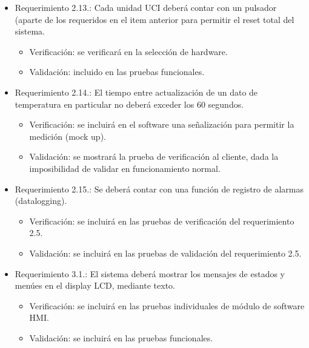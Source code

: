 \documentclass[
11pt, %
codirector, %
]{charter}
\begin{document}
\begin{itemize}
\begin{itemize}
\end{itemize}
\item Requerimiento 2.13.:  Cada unidad UCI deberá contar con un pulsador (aparte de los requeridos en el item anterior para permitir el reset total del sistema. 
\begin{itemize}
	\item Verificación: se verificará en la selección de hardware. 
	\item Validación: incluido en las pruebas funcionales.
\end{itemize}
\item Requerimiento 2.14.: El tiempo entre actualización de un dato de temperatura en particular no deberá exceder los 60 segundos.
\begin{itemize}
	\item Verificación: se incluirá en el software una señalización para permitir la medición (mock up).
	\item Validación: se mostrará la prueba de verificación al cliente, dada la imposibilidad de validar en funcionamiento normal.
\end{itemize}
\item Requerimiento 2.15.: Se deberá contar con una función de registro de alarmas (datalogging).  
\begin{itemize}
	\item Verificación: se incluirá en las pruebas de verificación del requerimiento 2.5.
	\item Validación: se incluirá en las pruebas de validación del requerimiento 2.5. 
\end{itemize}
\item Requerimiento 3.1.: El sistema deberá mostrar los mensajes de estados y menúes en el display LCD, mediante texto.  
\begin{itemize}
	\item Verificación: se incluirá en las pruebas individuales de módulo de software HMI. 
	\item Validación: se incluirá en las pruebas funcionales.
\end{itemize}

\end{itemize}
\end{document}
